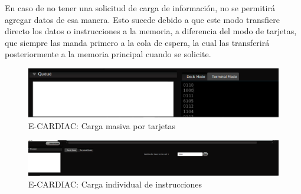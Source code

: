 \documentclass[letterpaper,12pt,oneside]{book}
\begin{document}
	En caso de no tener una solicitud de carga de información,
	no se permitirá agregar datos de esa manera. Esto sucede debido a que este modo transfiere directo los datos o instrucciones a la memoria,
	a diferencia del modo de tarjetas, que siempre las manda primero a la cola de espera, la cual las transferirá posteriormente a la memoria principal cuando se solicite.


	\begin{figure}[h]
 			\centering
			\includegraphics[scale=0.4]{media/ECARDIAC/DeckModeLoaded.png}
			\caption{E-CARDIAC: Carga masiva por tarjetas}
			\label{fig:ecardiacDeckMode}
	\end{figure}
	
	\begin{figure}[h]
 			\centering
			\includegraphics[scale=0.25]{media/ECARDIAC/TerminalMode.png}
			\caption{E-CARDIAC: Carga individual de instrucciones}
			\label{fig:ecardiacTerminalMode}
	\end{figure}
	
\end{document}
